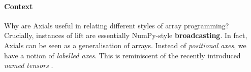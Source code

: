 

\paragraph{Context} Why are Axials useful in relating different styles of array programming? Crucially, instances of $\mathrm{lift}$ are essentially NumPy-style \textbf{broadcasting}.
In fact, Axials can be seen as a generalisation of arrays. 
Instead of \textit{positional axes}, we have a notion of \textit{labelled axes}. 
This is reminiscent of the recently introduced \textit{named tensors} \cite{chiang2022named}. 

